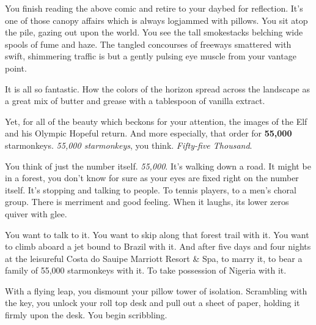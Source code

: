 \documentclass[12pt,twoside]{report}
\begin{document}
You finish reading the above comic and retire to your daybed for
reflection. It's one of those canopy affairs which is always logjammed
with pillows.  You sit atop the pile, gazing out upon the world.  You
see the tall smokestacks belching wide spools of fume and haze.  The
tangled concourses of freeways smattered with swift, shimmering
traffic is but a gently pulsing eye muscle from your vantage point.

It is all so fantastic.  How the colors of the horizon spread across
the landscape as a great mix of butter and grease with a tablespoon of
vanilla extract.

Yet, for all of the beauty which beckons for your attention, the
images of the Elf and his Olympic Hopeful return.  And more
especially, that order for {\bf 55,000} starmonkeys.  {\em 55,000
  starmonkeys}, you think.  {\em Fifty-five Thousand}.

You think of just the number itself.  {\em 55,000}.  It's walking down
a road.  It might be in a forest, you don't know for sure as your eyes
are fixed right on the number itself.  It's stopping and talking to
people.  To tennis players, to a men's choral group.  There is
merriment and good feeling.  When it laughs, its lower zeros quiver
with glee.

You want to talk to it.  You want to skip along that forest trail with
it.  You want to climb aboard a jet bound to Brazil with it.  And
after five days and four nights at the leisureful Costa do Sauipe
Marriott Resort \& Spa, to marry it, to bear a family of 55,000
starmonkeys with it. To take possession of Nigeria with it.

With a flying leap, you dismount your pillow tower of isolation.
Scrambling with the key, you unlock your roll top desk and pull out a
sheet of paper, holding it firmly upon the desk.  You begin
scribbling.
\end{document}
